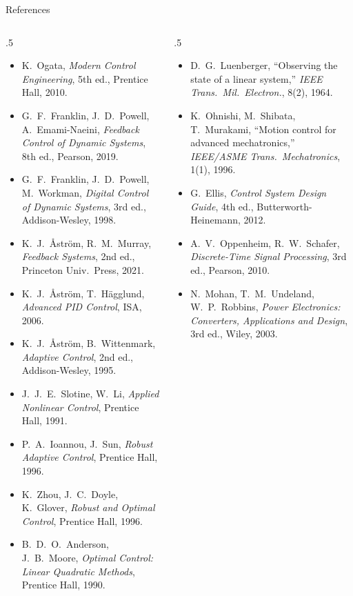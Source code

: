 \documentclass[aspectratio=169,10pt]{beamer}
\begin{document}
\begin{frame}{References}
\fontsize{7}{8.4}\selectfont
\begin{columns}[T]
\begin{column}{.5\textwidth}
\begin{itemize}\setlength\itemsep{.2mm}
\item K.~Ogata, \emph{Modern Control Engineering}, 5th ed., Prentice Hall, 2010.
\item G.~F.~Franklin, J.~D.~Powell, A.~Emami-Naeini, \emph{Feedback Control of Dynamic Systems}, 8th ed., Pearson, 2019.
\item G.~F.~Franklin, J.~D.~Powell, M.~Workman, \emph{Digital Control of Dynamic Systems}, 3rd ed., Addison-Wesley, 1998.
\item K.~J.~{\AA}str\"om, R.~M.~Murray, \emph{Feedback Systems}, 2nd ed., Princeton Univ.\ Press, 2021.
\item K.~J.~{\AA}str\"om, T.~H\"agglund, \emph{Advanced PID Control}, ISA, 2006.
\item K.~J.~{\AA}str\"om, B.~Wittenmark, \emph{Adaptive Control}, 2nd ed., Addison-Wesley, 1995.
\item J.~J.~E.~Slotine, W.~Li, \emph{Applied Nonlinear Control}, Prentice Hall, 1991.
\item P.~A.~Ioannou, J.~Sun, \emph{Robust Adaptive Control}, Prentice Hall, 1996.
\item K.~Zhou, J.~C.~Doyle, K.~Glover, \emph{Robust and Optimal Control}, Prentice Hall, 1996.
\item B.~D.~O.~Anderson, J.~B.~Moore, \emph{Optimal Control: Linear Quadratic Methods}, Prentice Hall, 1990.
\end{itemize}
\end{column}
\begin{column}{.5\textwidth}
\begin{itemize}\setlength\itemsep{.2mm}
\item D.~G.~Luenberger, ``Observing the state of a linear system,'' \emph{IEEE Trans.\ Mil.\ Electron.}, 8(2), 1964.
\item K.~Ohnishi, M.~Shibata, T.~Murakami, ``Motion control for advanced mechatronics,'' \emph{IEEE/ASME Trans.\ Mechatronics}, 1(1), 1996.
\item G.~Ellis, \emph{Control System Design Guide}, 4th ed., Butterworth-Heinemann, 2012.
\item A.~V.~Oppenheim, R.~W.~Schafer, \emph{Discrete-Time Signal Processing}, 3rd ed., Pearson, 2010.
\item N.~Mohan, T.~M.~Undeland, W.~P.~Robbins, \emph{Power Electronics: Converters, Applications and Design}, 3rd ed., Wiley, 2003.

\end{itemize}
\end{column}
\end{columns}
\end{frame}
\end{document}
